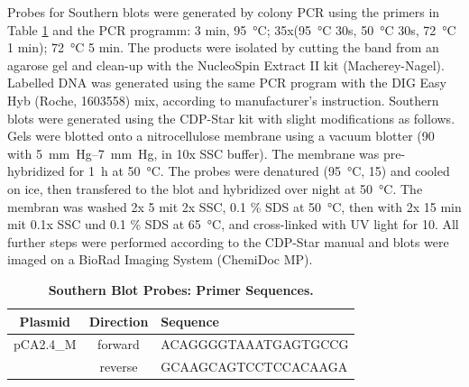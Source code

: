 \documentclass[10pt,a4]{article}
\begin{document}
Probes for Southern blots were generated by colony PCR using the
primers in Table \ref{tab:blot} and the PCR programm: 3 min,
\SI{95}{\celsius}; 35x(\SI{95}{\celsius} 30s, \SI{50}{\celsius} 30s,
\SI{72}{\celsius} 1 min); \SI{72}{\celsius} 5 min.  The products were
isolated by cutting the band from an agarose gel and clean-up with the
NucleoSpin Extract II kit (Macherey-Nagel).  Labelled DNA was
generated using the same PCR program with the DIG Easy Hyb (Roche,
1603558) mix, according to manufacturer's instruction.
%
Southern blots were generated using the CDP-Star kit with slight
modifications as follows.  Gels were blotted onto a nitrocellulose
membrane using a vacuum blotter  (\SI{90}{\min} with
\SIrange{5}{7}{mm Hg}, in 10x SSC buffer). The membrane was
pre-hybridized for \SI{1}{\hour} at \SI{50}{\celsius}.  The probes
were denatured (\SI{95}{\celsius}, \SI{15}{\min}) and cooled on ice,
then transfered to the blot and hybridized over night at
\SI{50}{\celsius}. The membran was washed 2x \SI{5}{\min} mit 2x SSC,
0.1 \% SDS at \SI{50}{\celsius}, then with 2x 15 min mit 0.1x SSC und
0.1 \% SDS at \SI{65}{\celsius}, and cross-linked with UV light
 for \SI{10}{\min}. All further steps were performed
according to the CDP-Star manual and blots were imaged on a
  BioRad Imaging System (ChemiDoc MP).





\begin{table}[ht!]
  \begin{tabular}{c|c|l}
    Plasmid & Direction & Sequence \\
    \hline
    pCA2.4\_M &forward & ACAGGGGTAAATGAGTGCCG\\ %
    &reverse & GCAAGCAGTCCTCCACAAGA  %
  \end{tabular}
  \caption{\textbf{Southern Blot Probes: Primer Sequences.}}
  \label{tab:blot}
\end{table}
\end{document}
